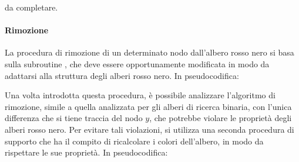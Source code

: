 

da completare.

\paragraph{Rimozione}
La procedura di rimozione di un determinato nodo dall'albero rosso nero si basa sulla subroutine , che deve essere opportunamente modificata in modo da adattarsi alla struttura degli alberi rosso nero. In pseudocodifica:



Una volta introdotta questa procedura, è possibile analizzare l'algoritmo di rimozione, simile a quella analizzata per gli alberi di ricerca binaria, con l'unica differenza che si tiene traccia del nodo \(y\), che potrebbe violare le proprietà degli alberi rosso nero. Per evitare tali violazioni, si utilizza una seconda procedura di supporto che ha il compito di ricalcolare i colori dell'albero, in modo da rispettare le sue proprietà. In pseudocodifica:





